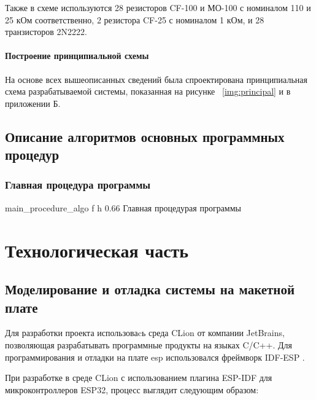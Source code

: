 \documentclass{bmstu}
\begin{document}
    Также в схеме используются 28 резисторов CF-100 и МО-100 с номиналом 110 и 25 кОм соответственно,
    2 резистора CF-25 с номиналом 1 кОм, и 28 транзисторов 2N2222.

    \subsubsection{Построение принципиальной схемы}

    На основе всех вышеописанных сведений была спроектирована принципиальная схема разрабатываемой системы,
    показанная на рисунке ~\ref{img:principal} и в приложении Б.




    \section{Описание алгоритмов основных программных процедур}

    \subsection{Главная процедура программы}

        {main_procedure_algo} %
        {f} %
        {h} %
        {0.66\textwidth} %
        {Главная процедурая программы} %

    \chapter{Технологическая часть}

    \section{Моделирование и отладка системы на макетной плате}

    Для разработки проекта использоваcь среда CLion \cite{ESPIDFCLion} от компании JetBrains, позволяющая разрабатывать программные продукты на языках C/C++.
    Для программирования и отладки на плате esp использовался фреймворк IDF-ESP \cite{GetStartedESP32}.

    При разработке в среде CLion с использованием плагина ESP-IDF для микроконтроллеров ESP32, процесс выглядит следующим образом:
\end{document}
